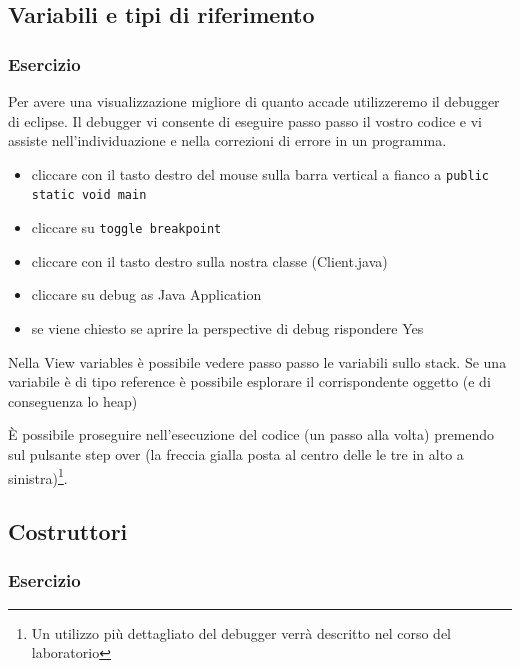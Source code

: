 \documentclass{article}
\theoremstyle{definition}
\begin{document}





\subsection{Variabili e tipi di riferimento}

\subsubsection{Esercizio}



Per avere una visualizzazione migliore di quanto accade utilizzeremo il debugger di eclipse. Il debugger vi consente di eseguire passo passo il vostro codice e vi assiste nell'individuazione e nella correzioni di errore in un programma.

\begin{itemize}
\item cliccare con il tasto destro del mouse sulla barra vertical a fianco a \texttt{public static void main}
\item cliccare su \texttt{toggle breakpoint}
\item cliccare con il tasto destro sulla nostra classe (Client.java)
\item cliccare su debug as Java Application
\item se viene chiesto se aprire la perspective di debug rispondere Yes
\end{itemize}
Nella View variables \`e possibile vedere passo passo le variabili sullo stack. Se una variabile \`e di tipo reference \`e possibile esplorare il corrispondente oggetto (e di conseguenza lo heap)

\`E possibile proseguire nell'esecuzione del codice (un passo alla volta) premendo sul pulsante step over (la freccia gialla posta al centro delle le tre in alto a sinistra)\footnote{Un utilizzo pi\`u dettagliato del debugger verr\`a descritto nel corso del laboratorio}.



\subsection{Costruttori}
\subsubsection{Esercizio}
\end{document}

